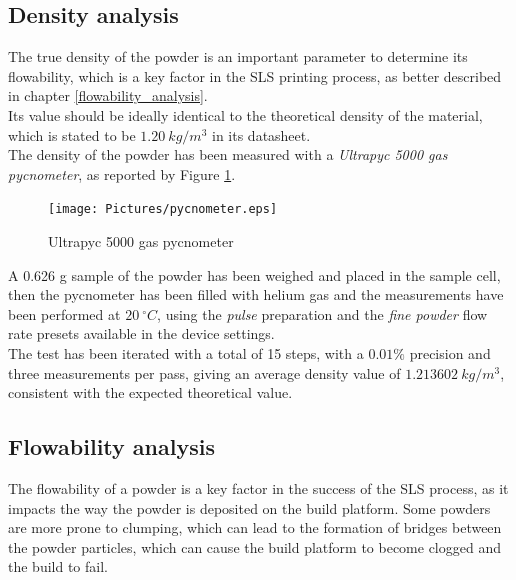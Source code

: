 \documentclass{article}
\begin{document}
        \clearpage

        \subsection{Density analysis\label{density_measurement}}

        The true density of the powder is an important parameter to determine its flowability, which is a key factor in the
        SLS printing process, as better described in chapter \ref{flowability_analysis}. \\
        
        Its value should be ideally identical to the theoretical density of the material, which is stated to be 
        $1.20 \ kg/m^3$ in its datasheet. \\ 
        
        The density of the powder has been measured with a \textit{Ultrapyc 5000 gas
        pycnometer}, as reported by Figure \ref{fig:ultrapyc5000}. \\ 
    
        \begin{figure}[ht]
            \centering
            \texttt{[image: Pictures/pycnometer.eps]}
            \caption{Ultrapyc 5000 gas pycnometer}
            \label{fig:ultrapyc5000}
        \end{figure}
    
        A 0.626 g sample of the powder has been weighed and placed in the sample cell, then the pycnometer has been filled with 
        helium gas and the measurements have been performed at $20 \ ^{\circ}C$, using the \textit{pulse} preparation and the 
        \textit{fine powder} flow rate presets available in the device settings. \\ 
    
        The test has been iterated with a total of 15 steps, with a $0.01 \%$ precision and three measurements per pass, giving an average 
        density value of $1.213602 \ kg/m^3$, consistent with the expected theoretical value. \\ 
    
        \clearpage

        \subsection{Flowability analysis\label{flowability_analysis}}

        The flowability of a powder is a key factor in the success of the SLS process, as it impacts the way the powder is deposited
        on the build platform. Some powders are more prone to clumping, which can lead to the formation of bridges between the powder 
        particles, which can cause the build platform to become clogged and the build to fail. \\ 
\end{document}
